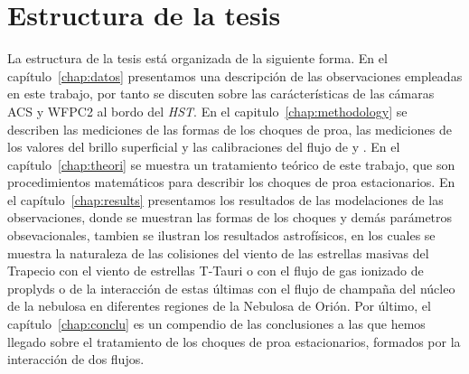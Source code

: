 \section{Estructura de la tesis}
\label{sec:estructura}

La estructura de la tesis está organizada de la siguiente forma. En el capítulo~\ref{chap:datos} presentamos una descripción de las observaciones empleadas en este trabajo, por tanto se discuten sobre las carácterísticas de las cámaras ACS y WFPC2 al bordo del \textit{HST}. En el capitulo~\ref{chap:methodology} se describen las mediciones de las formas de los choques de proa, las mediciones de los valores del brillo superficial y las calibraciones del flujo de \ha{} y \nii{}. En el capítulo~\ref{chap:theori} se muestra un tratamiento teórico de este trabajo, que son procedimientos matemáticos para describir los choques de proa estacionarios. En el capítulo~\ref{chap:results} presentamos los resultados de las modelaciones de las observaciones, donde se muestran las formas de los choques y demás parámetros obsevacionales, tambien se ilustran los resultados astrofísicos, en los cuales se muestra la naturaleza de las colisiones del viento de las estrellas masivas del Trapecio con el viento de estrellas T-Tauri o con el flujo de gas ionizado de  proplyds o de la interacción de estas últimas con el flujo de champaña del núcleo de la nebulosa en diferentes regiones de la Nebulosa de Orión. Por último, el capítulo~\ref{chap:conclu} es un compendio de las conclusiones a las que hemos llegado sobre el tratamiento de los choques de proa estacionarios, formados por la interacción de dos flujos.   
% 

% 

